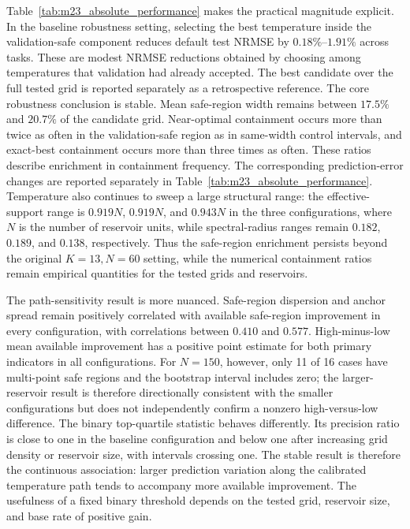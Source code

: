 \documentclass[preprint,12pt,authoryear]{elsarticle}
\begin{document}
Table~\ref{tab:m23_absolute_performance} makes the practical magnitude explicit. In the baseline robustness setting, selecting the best temperature inside the validation-safe component reduces default test NRMSE by $0.18\%$--$1.91\%$ across tasks. These are modest NRMSE reductions obtained by choosing among temperatures that validation had already accepted. The best candidate over the full tested grid is reported separately as a retrospective reference. The core robustness conclusion is stable. Mean safe-region width remains between $17.5\%$ and $20.7\%$ of the candidate grid. Near-optimal containment occurs more than twice as often in the validation-safe region as in same-width control intervals, and exact-best containment occurs more than three times as often. These ratios describe enrichment in containment frequency. The corresponding prediction-error changes are reported separately in Table~\ref{tab:m23_absolute_performance}. Temperature also continues to sweep a large structural range: the effective-support range is $0.919N$, $0.919N$, and $0.943N$ in the three configurations, where $N$ is the number of reservoir units, while spectral-radius ranges remain $0.182$, $0.189$, and $0.138$, respectively. Thus the safe-region enrichment persists beyond the original $K=13,N=60$ setting, while the numerical containment ratios remain empirical quantities for the tested grids and reservoirs.

The path-sensitivity result is more nuanced. Safe-region dispersion and anchor spread remain positively correlated with available safe-region improvement in every configuration, with correlations between $0.410$ and $0.577$. High-minus-low mean available improvement has a positive point estimate for both primary indicators in all configurations. For $N=150$, however, only 11 of 16 cases have multi-point safe regions and the bootstrap interval includes zero; the larger-reservoir result is therefore directionally consistent with the smaller configurations but does not independently confirm a nonzero high-versus-low difference. The binary top-quartile statistic behaves differently. Its precision ratio is close to one in the baseline configuration and below one after increasing grid density or reservoir size, with intervals crossing one. The stable result is therefore the continuous association: larger prediction variation along the calibrated temperature path tends to accompany more available improvement. The usefulness of a fixed binary threshold depends on the tested grid, reservoir size, and base rate of positive gain.
\end{document}
